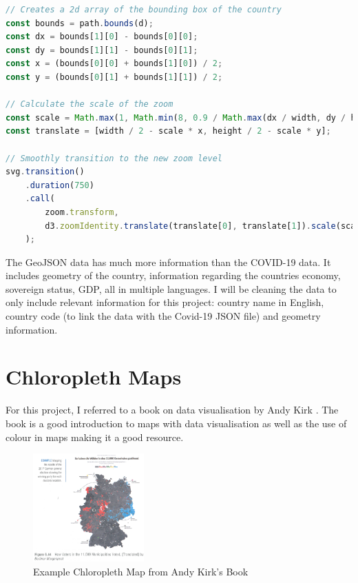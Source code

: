 \documentclass{report}
\begin{document}
\begin{lstlisting}[language=JavaScript]
// Creates a 2d array of the bounding box of the country
const bounds = path.bounds(d);
const dx = bounds[1][0] - bounds[0][0];
const dy = bounds[1][1] - bounds[0][1];
const x = (bounds[0][0] + bounds[1][0]) / 2;
const y = (bounds[0][1] + bounds[1][1]) / 2;

// Calculate the scale of the zoom
const scale = Math.max(1, Math.min(8, 0.9 / Math.max(dx / width, dy / height)));
const translate = [width / 2 - scale * x, height / 2 - scale * y];

// Smoothly transition to the new zoom level
svg.transition()
    .duration(750)
    .call(
        zoom.transform,
        d3.zoomIdentity.translate(translate[0], translate[1]).scale(scale)
    );
\end{lstlisting}

The GeoJSON data has much more information than the COVID-19 data. It includes geometry of the country, information regarding the countries economy, sovereign status, GDP, all in multiple languages. I will be cleaning the data to only include relevant information for this project: country name in English, country code (to link the data with the Covid-19 JSON file) and geometry information. 

\section{Chloropleth Maps}
For this project, I referred to a book on data visualisation by Andy Kirk \cite{andy2019kirk}. The book is a good introduction to maps with data visualisation as well as the use of colour in maps making it a good resource. \\

\begin{figure}
    \begin{center}
      \includegraphics[width=0.38\textwidth]{chloropleth-example.png}
    \end{center}
    \caption{Example Chloropleth Map from Andy Kirk's Book \cite{andy2019kirk}}
  \end{figure}
\end{document}
